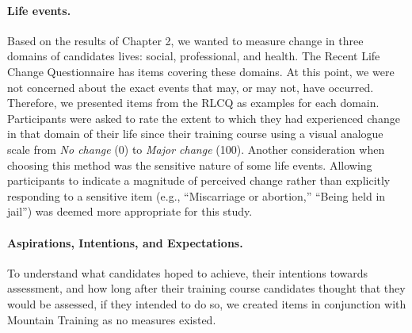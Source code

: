 \documentclass[
  12pt,
  a4paper,
]{book}
\begin{document}
\hypertarget{survey-tool-measures-life-events}{%
\paragraph{Life events.}\label{survey-tool-measures-life-events}}

Based on the results of Chapter 2, we wanted to measure change in three domains of candidates lives: social, professional, and health. The Recent Life Change Questionnaire \citep[RLCQ;][]{Miller1997} has items covering these domains. At this point, we were not concerned about the exact events that may, or may not, have occurred. Therefore, we presented items from the RLCQ as examples for each domain. Participants were asked to rate the extent to which they had experienced change in that domain of their life since their training course using a visual analogue scale from \emph{No change} (0) to \emph{Major change} (100). Another consideration when choosing this method was the sensitive nature of some life events. Allowing participants to indicate a magnitude of perceived change rather than explicitly responding to a sensitive item (e.g., ``Miscarriage or abortion,'' ``Being held in jail'') was deemed more appropriate for this study.

\hypertarget{aspirations-intentions-and-expectations.}{%
\paragraph{Aspirations, Intentions, and Expectations.}\label{aspirations-intentions-and-expectations.}}

To understand what candidates hoped to achieve, their intentions towards assessment, and how long after their training course candidates thought that they would be assessed, if they intended to do so, we created items in conjunction with Mountain Training as no measures existed.
\end{document}
